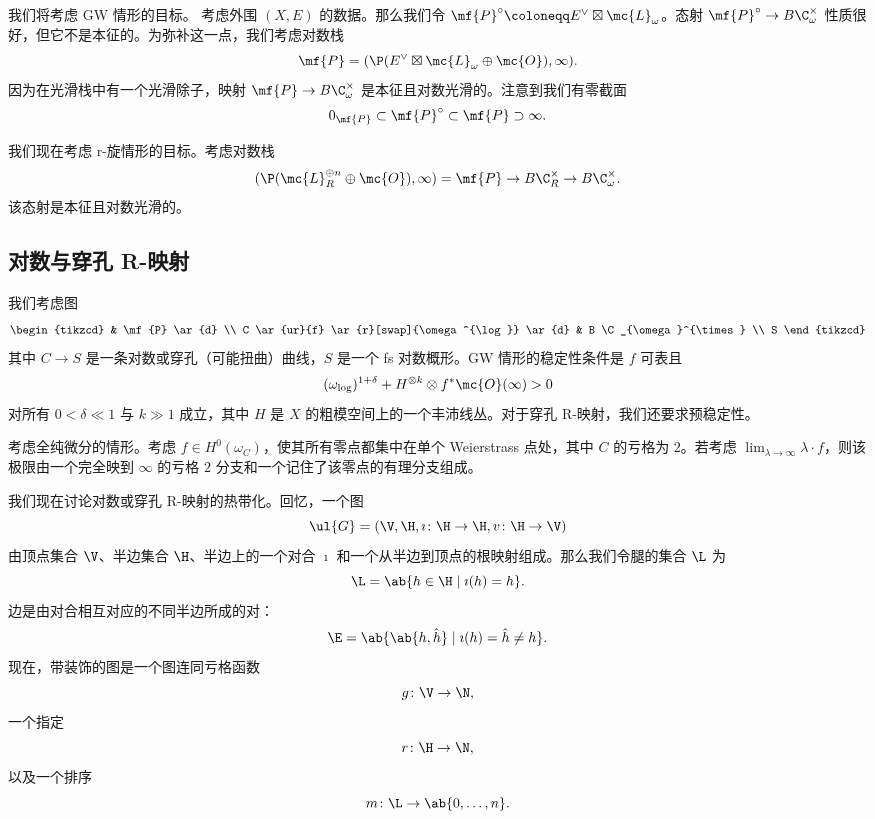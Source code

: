 我们将考虑 GW 情形的目标。
考虑外围 \((X, E)\) 的数据。那么我们令 \(\mf{P}^{\circ} \coloneqq E^{\vee} \boxtimes \mc{L}_{\omega}\)。态射 \(\mf{P}^{\circ} \to B \C_{\omega}^{\times}\) 性质很好，但它不是本征的。为弥补这一点，我们考虑对数栈
\[ \mf{P} = ( \P(E^{\vee} \boxtimes \mc{L}_{\omega} \oplus \mc{O}) , \infty). \]
因为在光滑栈中有一个光滑除子，映射 \(\mf{P} \to B \C_{\omega}^{\times}\) 是本征且对数光滑的。注意到我们有零截面
\[ 0_{\mf{P}} \subset \mf{P}^{\circ} \subset \mf{P} \supset \infty. \]

我们现在考虑 r-旋情形的目标。考虑对数栈
\[ (\P(\mc{L}_R^{\oplus n} \oplus \mc{O}), \infty) = \mf{P} \to B \C_R^{\times} \to B \C_{\omega}^{\times}. \]
该态射是本征且对数光滑的。

\subsection{对数与穿孔 R-映射}%
\label{sub:Log and punctured R-maps}

我们考虑图
\begin{equation*}
\begin{tikzcd}
    & \mf{P} \ar{d} \\
    C \ar{ur}{f} \ar{r}[swap]{\omega^{\log}} \ar{d} & B \C_{\omega}^{\times} \\
    S
\end{tikzcd}
\end{equation*}
其中 \(C \to S\) 是一条对数或穿孔（可能扭曲）曲线，\(S\) 是一个 fs 对数概形。GW 情形的稳定性条件是 \(f\) 可表且
\[ (\omega_{\log})^{1+\delta} + H^{\otimes k} \otimes f^* \mc{O}(\infty) > 0 \]
对所有 \(0 < \delta \ll 1\) 与 \(k \gg 1\) 成立，其中 \(H\) 是 \(X\) 的粗模空间上的一个丰沛线丛。对于穿孔 R-映射，我们还要求预稳定性。

\begin{exm}
    考虑全纯微分的情形。考虑 \(f \in H^0(\omega_C)\)，使其所有零点都集中在单个 Weierstrass 点处，其中 \(C\) 的亏格为 \(2\)。若考虑 \(\lim_{\lambda \to \infty} \lambda \cdot f\)，则该极限由一个完全映到 \(\infty\) 的亏格 \(2\) 分支和一个记住了该零点的有理分支组成。
\end{exm}

我们现在讨论对数或穿孔 R-映射的热带化。回忆，一个图
\[ \ul{G} = (\V, \H, \imath \colon \H \to \H, v \colon \H \to \V) \]
由顶点集合 \(\V\)、半边集合 \(\H\)、半边上的一个对合 \(\imath\) 和一个从半边到顶点的根映射组成。那么我们令腿的集合 \(\L\) 为
\[ \L = \ab\{ h \in \H \mid \imath(h) = h\}. \]
边是由对合相互对应的不同半边所成的对：
\[ \E = \ab\{ \ab\{h, \hat{h}\} \mid \imath(h) = \hat{h} \neq h \}. \]
现在，带装饰的图是一个图连同亏格函数
\[ g \colon \V \to \N, \]
一个指定
\[ r \colon \H \to \N, \]
以及一个排序
\[ m \colon \L \to \ab\{0, \ldots, n\}. \]

